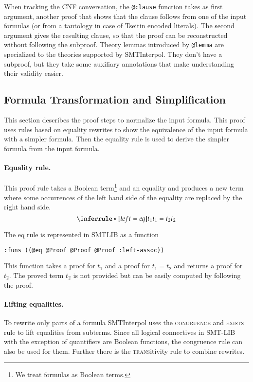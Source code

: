 \documentclass[a4paper]{article}
\newcommand\si{SMTInterpol\xspace}
\begin{document}
When tracking the CNF conversation, the \verb+@clause+ function takes
as first argument, another proof that shows that the clause follows
from one of the input formulas (or from a tautology in case of Tseitin
encoded literals).  The second argument gives the resulting clause, so
that the proof can be reconstructed without following the subproof.
Theory lemmas introduced by \verb+@lemma+ are specialized to the
theories supported by \si.  They don't have a subproof, but they take
some auxiliary annotations that make understanding their validity
easier.

\subsection{Formula Transformation and Simplification}

This section describes the proof steps to normalize the input formula.
This proof uses rules based on equality rewrites to show the
equivalence of the input formula with a simpler formula.  Then the
equality rule is used to derive the simpler formula from the input
formula.

\paragraph{Equality rule.}  This proof rule takes a Boolean term\footnote{We treat
  formulas as Boolean terms.} and an equality and produces a new term
where some occurrences of the left hand side of the equality are
replaced by the right hand side.
\[
\inferrule*[left=eq]{t_1 \\ t_1=t_2}{t_2}
\]

The eq rule is represented in SMTLIB as a function
\begin{verbatim}
:funs ((@eq @Proof @Proof @Proof :left-assoc))
\end{verbatim}
This function takes a proof for $t_1$ and a proof for $t_1=t_2$ and
returns a proof for $t_2$.  The proved term $t_2$ is not provided but
can be easily computed by following the proof.

\paragraph{Lifting equalities.}  To rewrite only parts of a formula
\si uses the \textsc{congruence} and \textsc{exists} rule to lift
equalities from subterms.  Since all logical connectives in SMT-LIB
with the exception of quantifiers are Boolean functions, the
congruence rule can also be used for them.  Further there is the
\textsc{trans}itivity rule to combine rewrites.
\end{document}
